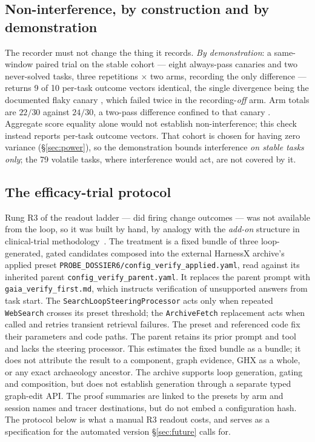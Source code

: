 \subsection{Non-interference, by construction and by demonstration}
\label{sec:non-interference}

The recorder must not change the thing it records.
\emph{By demonstration}: a same-window paired trial on the stable cohort
--- eight always-pass canaries and two never-solved tasks, three
repetitions $\times$ two arms, recording the only difference --- returns 9
of 10 per-task outcome vectors identical, the single divergence being the
documented flaky canary , which failed twice in the
recording-\emph{off} arm. Arm totals are $22/30$ against $24/30$, a
two-pass difference confined to that canary . Aggregate score equality
alone would not establish non-interference; this check instead reports
per-task outcome vectors. That
cohort is chosen for having zero variance (\S\ref{sec:power}), so the
demonstration bounds interference \emph{on stable tasks only}; the 79
volatile tasks, where interference would act, are not covered by it.

\subsection{The efficacy-trial protocol}
\label{sec:efficacy-protocol}

Rung R3 of the readout ladder --- did firing change outcomes --- was not
available from the loop, so it was built by hand, by analogy with the \emph{add-on} structure in
clinical-trial methodology~\cite{ich-e10}. The
treatment is a fixed bundle of three loop-generated, gated candidates
composed into the external HarnessX archive's applied preset
\texttt{PROBE\_DOSSIER6/config\_verify\_applied.yaml}, read against its
inherited parent \texttt{config\_verify\_parent.yaml}. It replaces the
parent prompt with \texttt{gaia\_verify\_first.md}, which instructs
verification of unsupported answers from task start. The
\texttt{SearchLoopSteeringProcessor} acts only when repeated
\texttt{WebSearch} crosses its preset threshold; the \texttt{ArchiveFetch}
replacement acts when called and retries transient retrieval failures. The
preset and referenced code fix their parameters and code paths. The parent
retains its prior prompt and tool and lacks the steering processor. This
estimates the fixed bundle as a bundle; it does not attribute the result to a
component, graph evidence, GHX as a whole, or any exact archaeology ancestor.
The archive supports loop generation, gating and composition, but does not
establish generation through a separate typed graph-edit API. The proof
summaries are linked to the presets by arm and session names and tracer
destinations, but do not embed a configuration hash. The protocol below is
what a manual R3 readout costs,
and serves as a specification for the automated version
\S\ref{sec:future} calls for.

